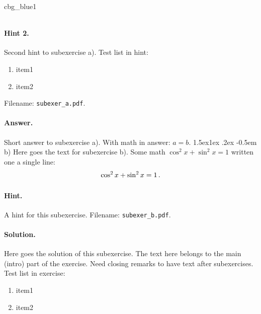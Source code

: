 \documentclass[%
oneside,                 %
final,                   %
10pt]{article}
\makeatletter
\newenvironment{_cod_tight}[1]{
   \def\FrameCommand{\colorbox{#1}}
   \FrameRule0.6pt\MakeFramed {\FrameRestore}\vskip3mm}
   {\vskip0mm\endMakeFramed}
\newenvironment{cod}[1]{
\bgroup\rmfamily
\fboxsep=0mm\relax
\begin{_cod_tight}{#1}
\list{}{\parsep=-2mm\parskip=0mm\topsep=0pt\leftmargin=2mm
\rightmargin=2\leftmargin\leftmargin=4pt\relax}
\item\relax}
{\endlist\end{_cod_tight}\egroup}
\newenvironment{doconceexercise}{}{}
\newcommand\subex{\@startsection{paragraph}{4}{\z@}%
                  {1.5ex\@plus1ex \@minus.2ex}%
                  {-0.5em}%
                  {\normalfont\normalsize\bfseries}}
\theoremstyle{definition}
\makeatother
\begin{document}
\begin{enumerate}
\begin{doconceexercise}
\begin{cod}{cbg_blue1}
\begin{lstlisting}[language=Python,style=myspeciallststyle,numbers=left,numberstyle=\tiny,stepnumber=3,numbersep=15pt,xleftmargin=1mm]
\end{lstlisting}\end{cod}
\noindent

\paragraph{Hint 2.}
Second hint to subexercise a).
Test list in hint:
\begin{enumerate}
\item item1
\item item2
\end{enumerate}
\noindent
\noindent Filename: \Verb!subexer_a.pdf!.
\paragraph{Answer.}
Short answer to subexercise a).
With math in answer: $a=b$.
\subex{b)}
Here goes the text for subexercise b).
Some math $\cos^2 x + \sin^2 x = 1$ written one a single line:
\[ \cos^2 x + \sin^2 x = 1 \thinspace .\]
\paragraph{Hint.}
A hint for this subexercise.
\noindent Filename: \Verb!subexer_b.pdf!.
\paragraph{Solution.}
Here goes the solution of this subexercise.
The text here belongs to the main (intro) part of the exercise. Need
closing remarks to have text after subexercises.
Test list in exercise:
\begin{enumerate}
\item item1
\item item2
\end{enumerate}
\noindent

\end{doconceexercise}
\end{enumerate}
\end{document}
